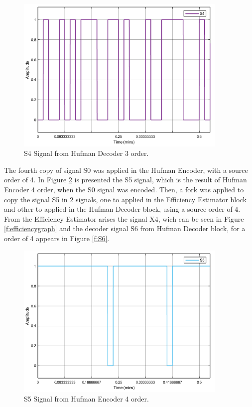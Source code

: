 \begin{refsection}
\begin{figure}[!h]
\centering
\includegraphics[width=4in]{./sdf/eit_45550_estimator_source_code_efficiency/figures/S4.png}
\caption[S4 Signal from Hufman Decoder 3 order.]{S4 Signal from Hufman Decoder 3 order.}
\label{f:S4}
\end{figure}

The fourth copy of signal S0 was applied in the Hufman Encoder, with a source order of 4. In Figure \ref{f:S5} is presented the S5 signal, which is the result of Hufman Encoder 4 order, when the S0 signal was encoded.
Then, a fork was applied to copy the signal S5 in 2 signals, one to applied in the Efficiency Estimator block and other to applied in the Hufman Decoder block, using a source order of 4.
From the Efficiency Estimator arises the signal X4, wich can be seen in Figure \ref{f:efficiencygraph} and the decoder signal S6 from Hufman Decoder block, for a order of 4 appears in Figure \ref{f:S6}. 


\begin{figure}[!h]
\centering
\includegraphics[width=4in]{./sdf/eit_45550_estimator_source_code_efficiency/figures/S5.png}
\caption[S5 Signal from Hufman Encoder 4 order.]{S5 Signal from Hufman Encoder 4 order.}
\label{f:S5}
\end{figure}



\end{refsection}

